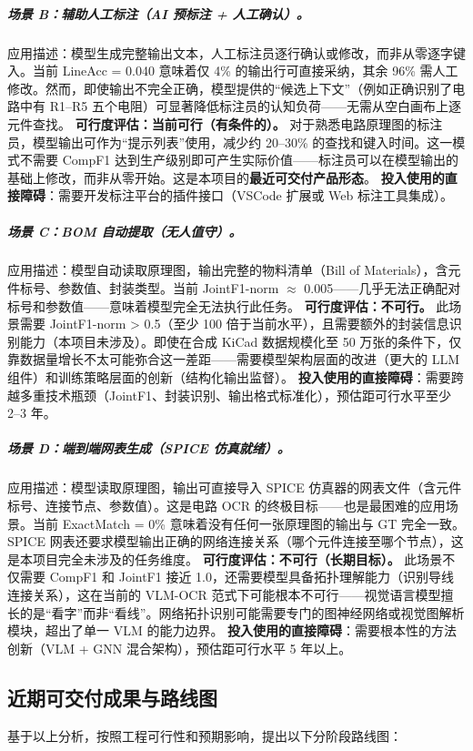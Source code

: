 \subparagraph{场景 B：辅助人工标注（AI 预标注 + 人工确认）。}
应用描述：模型生成完整输出文本，人工标注员逐行确认或修改，而非从零逐字键入。当前 LineAcc = 0.040 意味着仅 4\% 的输出行可直接采纳，其余 96\% 需人工修改。然而，即使输出不完全正确，模型提供的``候选上下文''（例如正确识别了电路中有 R1--R5 五个电阻）可显著降低标注员的认知负荷——无需从空白画布上逐元件查找。
\textbf{可行度评估：当前可行（有条件的）。} 对于熟悉电路原理图的标注员，模型输出可作为``提示列表''使用，减少约 20--30\% 的查找和键入时间。这一模式不需要 CompF1 达到生产级别即可产生实际价值——标注员可以在模型输出的基础上修改，而非从零开始。这是本项目的\textbf{最近可交付产品形态}。
\textbf{投入使用的直接障碍}：需要开发标注平台的插件接口（VSCode 扩展或 Web 标注工具集成）。

\subparagraph{场景 C：BOM 自动提取（无人值守）。}
应用描述：模型自动读取原理图，输出完整的物料清单（Bill of Materials），含元件标号、参数值、封装类型。当前 JointF1-norm $\approx$ 0.005——几乎无法正确配对标号和参数值——意味着模型完全无法执行此任务。
\textbf{可行度评估：不可行。} 此场景需要 JointF1-norm > 0.5（至少 100 倍于当前水平），且需要额外的封装信息识别能力（本项目未涉及）。即使在合成 KiCad 数据规模化至 50 万张的条件下，仅靠数据量增长不太可能弥合这一差距——需要模型架构层面的改进（更大的 LLM 组件）和训练策略层面的创新（结构化输出监督）。
\textbf{投入使用的直接障碍}：需要跨越多重技术瓶颈（JointF1、封装识别、输出格式标准化），预估距可行水平至少 2--3 年。

\subparagraph{场景 D：端到端网表生成（SPICE 仿真就绪）。}
应用描述：模型读取原理图，输出可直接导入 SPICE 仿真器的网表文件（含元件标号、连接节点、参数值）。这是电路 OCR 的终极目标——也是最困难的应用场景。当前 ExactMatch = 0\% 意味着没有任何一张原理图的输出与 GT 完全一致。SPICE 网表还要求模型输出正确的网络连接关系（哪个元件连接至哪个节点），这是本项目完全未涉及的任务维度。
\textbf{可行度评估：不可行（长期目标）。} 此场景不仅需要 CompF1 和 JointF1 接近 1.0，还需要模型具备拓扑理解能力（识别导线连接关系），这在当前的 VLM-OCR 范式下可能根本不可行——视觉语言模型擅长的是``看字''而非``看线''。网络拓扑识别可能需要专门的图神经网络或视觉图解析模块，超出了单一 VLM 的能力边界。
\textbf{投入使用的直接障碍}：需要根本性的方法创新（VLM + GNN 混合架构），预估距可行水平 5 年以上。

\subsection{近期可交付成果与路线图}

基于以上分析，按照工程可行性和预期影响，提出以下分阶段路线图：

